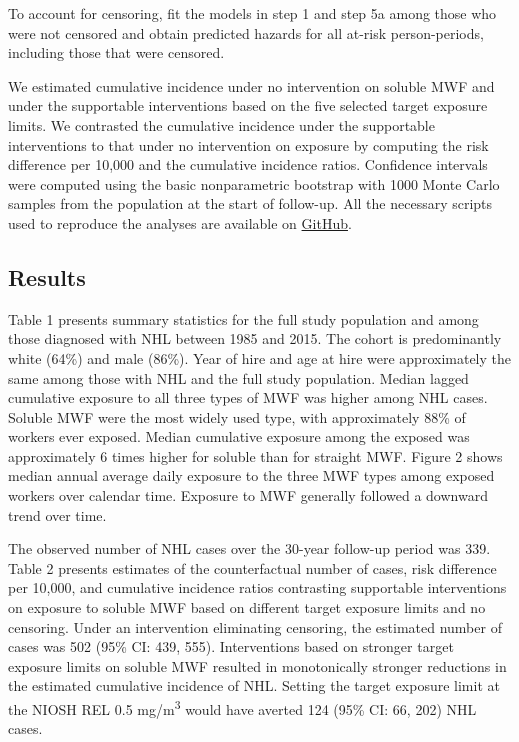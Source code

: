 \documentclass[
  11pt,
  letterpaper,
  DIV=11,
  numbers=noendperiod]{scrartcl}
\begin{document}
To account for censoring, fit the models in step 1 and step 5a among
those who were not censored and obtain predicted hazards for all at-risk
person-periods, including those that were censored.

We estimated cumulative incidence under no intervention on soluble MWF
and under the supportable interventions based on the five selected
target exposure limits. We contrasted the cumulative incidence under the
supportable interventions to that under no intervention on exposure by
computing the risk difference per 10,000 and the cumulative incidence
ratios. Confidence intervals were computed using the basic nonparametric
bootstrap with 1000 Monte Carlo samples from the population at the start
of follow-up. All the necessary scripts used to reproduce the analyses
are available on \href{https://github.com/kvntchn/gm-nhl-ice}{GitHub}.

\subsection{Results}\label{results}

Table 1 presents summary statistics for the full study population and
among those diagnosed with NHL between 1985 and 2015. The cohort is
predominantly white (64\%) and male (86\%). Year of hire and age at hire
were approximately the same among those with NHL and the full study
population. Median lagged cumulative exposure to all three types of MWF
was higher among NHL cases. Soluble MWF were the most widely used type,
with approximately 88\% of workers ever exposed. Median cumulative
exposure among the exposed was approximately 6 times higher for soluble
than for straight MWF. Figure 2 shows median annual average daily
exposure to the three MWF types among exposed workers over calendar
time. Exposure to MWF generally followed a downward trend over time.

The observed number of NHL cases over the 30-year follow-up period was
339. Table 2 presents estimates of the counterfactual number of cases,
risk difference per 10,000, and cumulative incidence ratios contrasting
supportable interventions on exposure to soluble MWF based on different
target exposure limits and no censoring. Under an intervention
eliminating censoring, the estimated number of cases was 502 (95\% CI:
439, 555). Interventions based on stronger target exposure limits on
soluble MWF resulted in monotonically stronger reductions in the
estimated cumulative incidence of NHL. Setting the target exposure limit
at the NIOSH REL 0.5 mg/m\textsuperscript{3} would have averted 124
(95\% CI: 66, 202) NHL cases.
\end{document}
